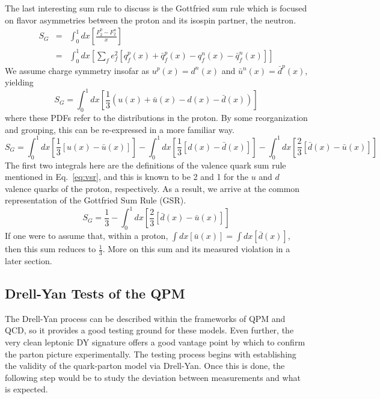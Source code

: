 The last interesting sum rule to discuss is the Gottfried sum rule which is focused on flavor asymmetries between the proton and its isospin partner, the neutron.
\begin{eqnarray}
  S_G & = & \int_0^1 dx \left[\frac{F_2^p - F_2^n}{x}\right] \\
  & = & \int_0^1 dx \left[ \sum\limits_f e_f^2 [q_f^p(x) + \bar{q}_f^p(x) - q_f^n(x) - \bar{q}_f^n(x)] \right]
\end{eqnarray}
We assume charge symmetry insofar as $u^p(x) = d^n(x)$ and $\bar{u}^n (x) = \bar{d}^p(x)$, yielding
\begin{equation}
S_G = \int_0^1 dx \left[ \frac{1}{3} (u(x) + \bar{u}(x) - d(x) - \bar{d}(x)) \right]
\end{equation}
where these PDFs refer to the distributions in the proton. By some reorganization and grouping, this can be re-expressed in a more familiar way.
\begin{equation}
S_G = \int_0^1 dx \left[\frac{1}{3} [u(x) - \bar{u}(x)] \right] - 
      \int_0^1 dx \left[\frac{1}{3} [d(x) - \bar{d}(x)] \right] -
      \int_0^1 dx \left[\frac{2}{3} [\bar{d}(x) - \bar{u}(x)] \right]
\end{equation}
The first two integrals here are the definitions of the valence quark sum rule mentioned in Eq.~\ref{eq:vsr}, and this is known to be 2 and 1 for the $u$ and $d$ valence quarks of the proton, respectively. As a result, we arrive at the common representation of the Gottfried Sum Rule (GSR).
\begin{equation}
	  S_G = \frac{1}{3} - \int_0^1 dx \left[ \frac{2}{3} [\bar{d}(x) - \bar{u}(x)] \right]
      \label{eq:gsr}
\end{equation}
If one were to assume that, within a proton, $\int dx [\bar{u}(x)] = \int dx[\bar{d}(x)]$, then this sum reduces to $\frac{1}{3}$. More on this sum and its measured violation in a later section.

\subsection{Drell-Yan Tests of the QPM}

The Drell-Yan process can be described within the frameworks of QPM and QCD, so it provides a good testing ground for these models. Even further, the very clean leptonic DY signature offers a good vantage point by which to confirm the parton picture experimentally. The testing process begins with establishing the validity of the quark-parton model via Drell-Yan. Once this is done, the following step would be to study the deviation between measurements and what is expected.

